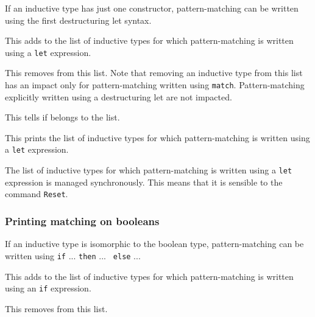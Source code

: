 If an inductive type has just one constructor,
pattern-matching can be written using the first destructuring let syntax.

\begin{quote}
{}
\end{quote}
This adds {\ident} to the list of inductive types for which
pattern-matching is written using a {\tt let} expression.

\begin{quote}
{}
\end{quote}
This removes {\ident} from this list. Note that removing an inductive
type from this list has an impact only for pattern-matching written using
\texttt{match}. Pattern-matching explicitly written using a destructuring
let are not impacted.

\begin{quote}
{}
\end{quote}
This tells if {\ident} belongs to the list.

\begin{quote}
{}
\end{quote}
This prints the list of inductive types for which pattern-matching is
written using a {\tt let} expression.

The list of inductive types for which pattern-matching is written
using a {\tt let} expression is managed synchronously. This means that
it is sensible to the command {\tt Reset}.

\subsubsection{Printing matching on booleans
}

If an inductive type is isomorphic to the boolean type,
pattern-matching can be written using {\tt if} ... {\tt then} ... {\tt
  else} ...

\begin{quote}
{}
\end{quote}
This adds {\ident} to the list of inductive types for which
pattern-matching is written using an {\tt if} expression.

\begin{quote}
{}
\end{quote}
This removes {\ident} from this list.

